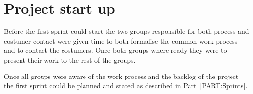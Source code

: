 \section{Project start up}
Before the first sprint could start the two groups responsible for both process and costumer contact were given time to both formalise the common work process and to contact the costumers.
Once both groups where ready they were to present their work to the rest of the groups.

Once all groups were aware of the work process and the backlog of the project the first sprint could be planned and stated as described in Part~\ref{PART:Sprints}.